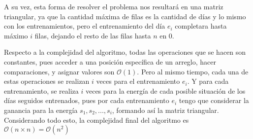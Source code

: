 A su vez, esta forma de resolver el problema nos resultará en una matriz triangular, ya que la cantidad máxima de filas es la cantidad de días y lo mismo con los entrenamientos, pero el entrenamiento del día $e_i$ completara hasta máximo $i$ filas, dejando el resto de las filas hasta $n$ en 0.

Respecto a la complejidad del algoritmo, todas las operaciones que se hacen son constantes, pues acceder a una posición específica de un arreglo, hacer comparaciones, y asignar valores son $\mathcal{O}(1)$. Pero al mismo tiempo, cada una de estas operaciones se realizan $i$ veces para el entrenamiento $e_i$. Y para cada entrenamiento, se realiza $i$ veces para la energía de cada posible situación de los días seguidos entrenados, pues por cada entrenamiento $e_i$ tengo que considerar la ganancia para la energía $s_1, s_2, ..., s_i$, formando así la matriz triangular. Considerando todo esto, la complejidad final del algoritmo es $\mathcal{O}(n \times n) = \mathcal{O}(n^2)$ 


